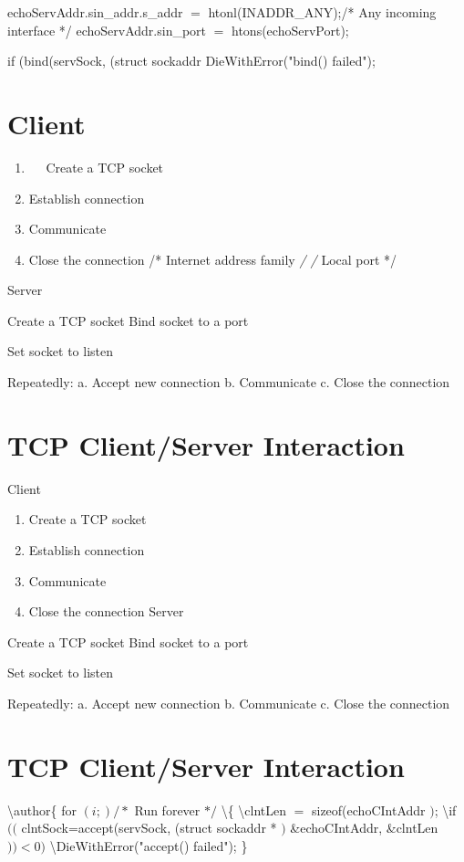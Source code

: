 \documentclass[10pt]{article}
\begin{document}
echoServAddr.sin\_addr.s\_addr $=$ htonl(INADDR\_ANY);/* Any incoming interface */ echoServAddr.sin\_port $=$ htons(echoServPort);

if (bind(servSock, (struct sockaddr DieWithError("bind() failed");

\section{Client}
\begin{enumerate}
  \item $\quad$ Create a TCP socket

  \item Establish connection

  \item Communicate

  \item Close the connection /* Internet address family \textit{/ /} Local port */

\end{enumerate}

Server

Create a TCP socket Bind socket to a port

Set socket to listen

Repeatedly:
a. Accept new connection
b. Communicate
c. Close the connection

\section*{TCP Client/Server Interaction }
Client

\begin{enumerate}
  \item Create a TCP socket

  \item Establish connection

  \item Communicate

  \item Close the connection Server

\end{enumerate}

Create a TCP socket Bind socket to a port

Set socket to listen

Repeatedly:
a. Accept new connection
b. Communicate
c. Close the connection

\section*{TCP Client/Server Interaction }
\textbackslash author\{
for $(i ;) / *$ Run forever $* /$ \textbackslash  \{ \textbackslash  clntLen $=$ sizeof(echoCIntAddr $)$; \textbackslash  if $(($ clntSock=accept(servSock, (struct sockaddr * $)$ \&echoCIntAddr, \&clntLen $))<0)$ \textbackslash  DieWithError("accept() failed");
\}
\end{document}
